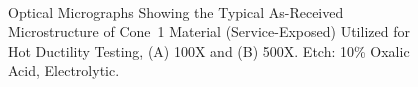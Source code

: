 \begin{figure}
\centering
{} \\
\caption[Optical Micrographs Showing the Typical As-Received Microstructure of Cone~1 Material.]{Optical Micrographs Showing the Typical As-Received Microstructure of Cone~1 Material (Service-Exposed) Utilized for Hot Ductility Testing, (A) 100X and (B) 500X.  Etch: 10\% Oxalic Acid, Electrolytic.}
\label{fig:c1-asreceived}
\end{figure}


